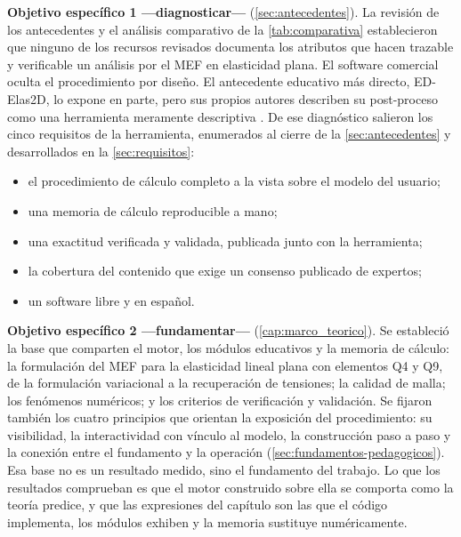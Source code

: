 \textbf{Objetivo específico 1 —diagnosticar—} (\autoref{sec:antecedentes}). La revisión de los antecedentes y el análisis comparativo de la \autoref{tab:comparativa} establecieron que ninguno de los recursos revisados documenta los atributos que hacen trazable y verificable un análisis por el MEF en elasticidad plana. El software comercial oculta el procedimiento por diseño. El antecedente educativo más directo, ED-Elas2D, lo expone en parte, pero sus propios autores describen su post-proceso como una herramienta meramente descriptiva \autocite[p.~253]{suarez1998edelas2d}. De ese diagnóstico salieron los cinco requisitos de la herramienta, enumerados al cierre de la \autoref{sec:antecedentes} y desarrollados en la \autoref{sec:requisitos}:
\begin{itemize}
    \item el procedimiento de cálculo completo a la vista sobre el modelo del usuario;
    \item una memoria de cálculo reproducible a mano;
    \item una exactitud verificada y validada, publicada junto con la herramienta;
    \item la cobertura del contenido que exige un consenso publicado de expertos;
    \item un software libre y en español.
\end{itemize}

\textbf{Objetivo específico 2 —fundamentar—} (\autoref{cap:marco_teorico}). Se estableció la base que comparten el motor, los módulos educativos y la memoria de cálculo: la formulación del MEF para la elasticidad lineal plana con elementos Q4 y Q9, de la formulación variacional a la recuperación de tensiones; la calidad de malla; los fenómenos numéricos; y los criterios de verificación y validación. Se fijaron también los cuatro principios que orientan la exposición del procedimiento: su visibilidad, la interactividad con vínculo al modelo, la construcción paso a paso y la conexión entre el fundamento y la operación (\autoref{sec:fundamentos-pedagogicos}). Esa base no es un resultado medido, sino el fundamento del trabajo. Lo que los resultados comprueban es que el motor construido sobre ella se comporta como la teoría predice, y que las expresiones del capítulo son las que el código implementa, los módulos exhiben y la memoria sustituye numéricamente.

